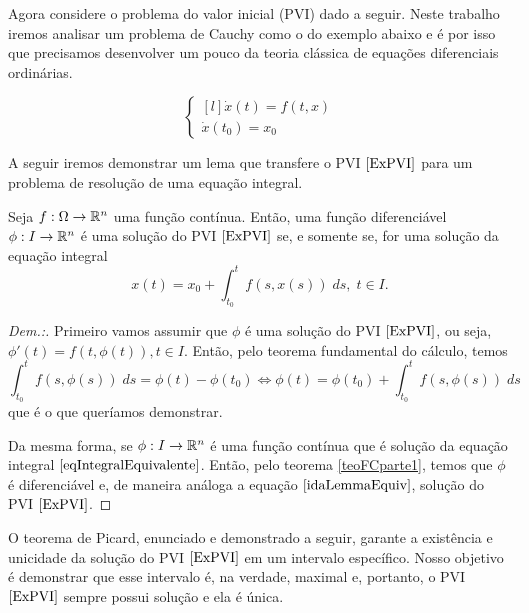 Agora considere o problema do valor inicial (PVI) dado a seguir. Neste trabalho iremos analisar um problema de Cauchy como o do exemplo abaixo e é por isso que precisamos desenvolver um pouco da teoria clássica de equações diferenciais ordinárias.

\begin{equation}
\label{ExPVI}
    \left\{\begin{matrix*}[l]
        \Dot{x}(t)=f(t,x)\\
        \Dot{x}(t_0)=x_0
    \end{matrix*}\right.
\end{equation}

A seguir iremos demonstrar um lema que transfere o PVI $\eqref{ExPVI}$ para um problema de resolução de uma equação integral.

\begin{lemma}
    \label{lemmaEquivalencia}
    Seja $f:\Omega\to\mathbb{R}^n$ uma função contínua. Então, uma função diferenciável $\phi:I\to\mathbb{R}^n$ é uma solução do PVI $\eqref{ExPVI}$ se, e somente se, for uma solução da equação integral
    \begin{equation}
        \label{eqIntegralEquivalente}
        x(t)=x_0 + \int_{t_0}^t f(s,x(s)) \; ds, \; t\in I.
    \end{equation}
\end{lemma}
\begin{proof}[Dem.:]
    Primeiro vamos assumir que $\phi$ é uma solução do PVI $\eqref{ExPVI}$, ou seja, $\phi'(t)=f(t,\phi(t)),t\in I$. Então, pelo teorema fundamental do cálculo, temos
    \begin{equation}
        \label{idaLemmaEquiv}
        \int_{t_0}^t f(s,\phi(s)) \; ds = \phi(t)-\phi(t_0) \Longleftrightarrow \phi(t) = \phi(t_0) + \int_{t_0}^t f(s,\phi(s)) \; ds
    \end{equation}
    que é o que queríamos demonstrar.
    
    Da mesma forma, se $\phi:I\to\mathbb{R}^n$ é uma função contínua que é solução da equação integral $\eqref{eqIntegralEquivalente}$. Então, pelo teorema \ref{teoFCparte1}, temos que $\phi$ é diferenciável e, de maneira análoga a equação $\eqref{idaLemmaEquiv}$, solução do PVI $\eqref{ExPVI}$.
\end{proof}

O teorema de Picard, enunciado e demonstrado a seguir, garante a existência e unicidade da solução do PVI $\eqref{ExPVI}$ em um intervalo específico. Nosso objetivo é demonstrar que esse intervalo é, na verdade, maximal e, portanto, o PVI $\eqref{ExPVI}$ sempre possui solução e ela é única.

